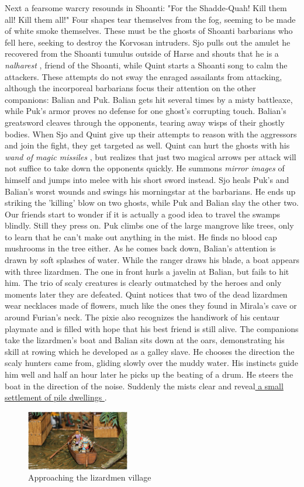Next a fearsome warcry resounds in Shoanti: "For the Shadde-Quah! Kill them all! Kill them all!" Four shapes tear themselves from the fog, seeming to be made of white smoke themselves. These must be the ghosts of Shoanti barbarians who fell here, seeking to destroy the Korvosan intruders. Sjo pulls out the amulet he recovered from the Shoanti tumulus outside of Harse and shouts that he is a {\itshape nalharest} , friend of the Shoanti, while Quint starts a Shoanti song to calm the attackers. These attempts do not sway the enraged assailants from attacking, although the incorporeal barbarians focus their attention on the other companions: Balian and Puk. Balian gets hit several times by a misty battleaxe, while Puk's armor proves no defense for one ghost's corrupting touch. Balian's greatsword cleaves through the opponents, tearing away wisps of their ghostly bodies. When Sjo and Quint give up their attempts to reason with the aggressors and join the fight, they get targeted as well. Quint can hurt the ghosts with his  {\itshape wand of magic missiles} , but realizes that just two magical arrows per attack will not suffice to take down the opponents quickly. He summons  {\itshape mirror images} of himself and jumps into melee with his short sword instead. Sjo heals Puk's and Balian's worst wounds and swings his morningstar at the barbarians. He ends up striking the 'killing' blow on two ghosts, while Puk and Balian slay the other two. Our friends start to wonder if it is actually a good idea to travel the swamps blindly. Still they press on. Puk climbs one of the large mangrove like trees, only to learn that he can't make out anything in the mist. He finds no blood cap mushrooms in the tree either. As he comes back down, Balian's attention is drawn by soft splashes of water. While the ranger draws his blade, a boat appears with three lizardmen. The one in front hurls a javelin at Balian, but fails to hit him. The trio of scaly creatures is clearly outmatched by the heroes and only moments later they are defeated. Quint notices that two of the dead lizardmen wear necklaces made of flowers, much like the ones they found in Mirala's cave or around Furian's neck. The pixie also recognizes the handiwork of his centaur playmate and is filled with hope that his best friend is still alive. The companions take the lizardmen's boat and Balian sits down at the oars, demonstrating his skill at rowing which he developed as a galley slave. He chooses the direction the scaly hunters came from, gliding slowly over the muddy water. His instincts guide him well and half an hour later he picks up the beating of a drum. He steers the boat in the direction of the noise. Suddenly the mists clear and reveal\hyperref[fig:Approaching-the-lizardmen-village-540871537]{ a small settlement of pile dwellings } . \\

\begin{figure}[h]
	\centering
	\includegraphics[width=0.4\textwidth]{images/Approaching-the-lizardmen-village-540871537_mod.jpg}
	\caption{Approaching the lizardmen village}
	\label{fig:Approaching-the-lizardmen-village-540871537}
\end{figure}

